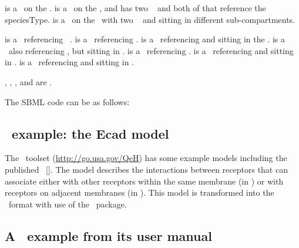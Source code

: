  is a \speciesType\ on the  \compartment.  is a \speciesType\ on the  \compartment, and has two \speciesTypeInstances\  and  both of that reference the  speciesType.  is a \speciesType\ on the  \compartment\ with two \speciesTypeInstances\  and  sitting in different sub-compartments.

 is a \species\ referencing \speciesType\ .  is a \species\ referencing .  is a \species\ referencing  and sitting in the  \compartment.  is a \species\ also referencing , but sitting in .  is a \species\ referencing .  is a \species\ referencing  and sitting in . is a \species\ referencing  and sitting in .

, , ,  and  are \fullydefinedspeciesWC.

The SBML code can be as follows:



\subsection{\Simmune\ example: the Ecad model} 
\label{def:Example:Simmune:EcadModel}

The \Simmune\  toolset (\url{http://go.usa.gov/QeH}) has some example models including the published  \model\ [\cite{ref:simmune2012}]. The  model describes the interactions between  receptors that can associate either with other  receptors within the same membrane (in ) or with  receptors on adjacent membranes (in ). This model is transformed into the \SbmlLevelThree\ format with use of the \multi\ package.



\subsection{A \BioNetGen\ example from its user manual}
\label{Example:BioNetGen}

